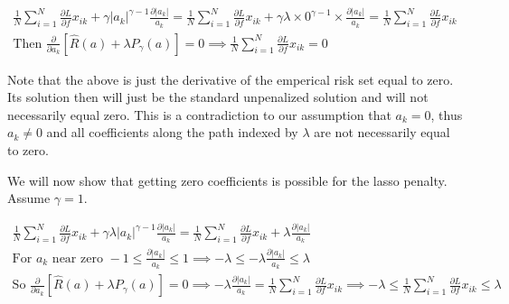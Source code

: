 \documentclass[11pt]{article}
\begin{document}
\begin{gather*}
\frac{1}{N} \sum_{i = 1}^{N} \frac{\partial L}{\partial f} x_{ik} + 
\gamma |a_{k}|^{\gamma - 1} \frac{\partial |a_{k}|}{a_{k}} = 
\frac{1}{N} \sum_{i = 1}^{N} \frac{\partial L}{\partial f} x_{ik} + 
\gamma \lambda \times 0^{\gamma - 1} \times \frac{\partial |a_{k}|}{a_{k}} = 
\frac{1}{N} \sum_{i = 1}^{N} \frac{\partial L}{\partial f} x_{ik}\\
\text{Then } 
\frac{\partial}{\partial a_{k}} [\hat{R}(a) + \lambda P_{\gamma}(a)] = 0 \implies 
\frac{1}{N} \sum_{i = 1}^{N} \frac{\partial L}{\partial f} x_{ik} = 0
\end{gather*}

\vspace{5mm}
\noindent
Note that the above is just the derivative of the emperical risk set equal to 
zero. Its solution then will just be the standard unpenalized solution and 
will not necessarily equal zero. This is a contradiction to our assumption that 
$a_{k} = 0$, thus $a_{k} \ne 0$ and all coefficients along the path indexed by 
$\lambda$ are not necessarily equal to zero.

\vspace{5mm}
\noindent
We will now show that getting zero coefficients is possible for the lasso 
penalty. Assume $\gamma = 1$.

\begin{gather*}
\frac{1}{N} \sum_{i = 1}^{N} \frac{\partial L}{\partial f} x_{ik} + 
\gamma \lambda |a_{k}|^{\gamma - 1} \frac{\partial |a_{k}|}{a_{k}} = 
\frac{1}{N} \sum_{i = 1}^{N} \frac{\partial L}{\partial f} x_{ik} + 
\lambda \frac{\partial |a_{k}|}{a_{k}}\\
\text{For } a_{k} \text{ near zero } 
-1 \le \frac{\partial |a_{k}|}{a_{k}} \le 1 \implies 
-\lambda \le -\lambda \frac{\partial |a_{k}|}{a_{k}} \le \lambda\\
\text{So } 
\frac{\partial}{\partial a_{k}} [\hat{R}(a) + \lambda P_{\gamma}(a)] = 0 \implies 
-\lambda \frac{\partial |a_{k}|}{a_{k}} = 
\frac{1}{N} \sum_{i = 1}^{N} \frac{\partial L}{\partial f} x_{ik} \implies 
-\lambda \le \frac{1}{N} \sum_{i = 1}^{N} \frac{\partial L}{\partial f} x_{ik} \le \lambda
\end{gather*}
\end{document}
